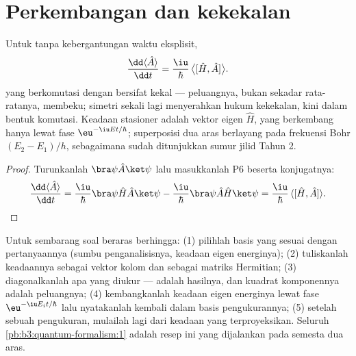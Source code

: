 \section{Perkembangan dan kekekalan}

\begin{proposition}\label{prop:b3:quantum-formalism:evolution}
Untuk  tanpa kebergantungan waktu eksplisit,
\[
\frac{\dd\langle\hat A\rangle}{\dd t}
 = \frac{\iu}{\hbar}\,\big\langle[\hat H, \hat A]\big\rangle .
\]
 yang berkomutasi dengan  bersifat kekal
--- peluangnya, bukan sekadar rata-ratanya, membeku; simetri sekali lagi
menyerahkan hukum kekekalan, kini dalam bentuk komutasi. Keadaan
stasioner adalah vektor eigen $\hat H$, yang berkembang hanya lewat fase
$\eu^{-\iu Et/\hbar}$; superposisi dua aras berlayang pada frekuensi
Bohr $(E_2 - E_1)/h$, sebagaimana sudah ditunjukkan sumur jilid Tahun 2.
\end{proposition}

\begin{proof}
Turunkanlah $\bra\psi\hat A\ket\psi$ lalu masukkanlah P6 beserta
konjugatnya:
\[
\frac{\dd\langle\hat A\rangle}{\dd t}
 = \frac{\iu}{\hbar}\bra\psi\hat H\hat A\ket\psi
 - \frac{\iu}{\hbar}\bra\psi\hat A\hat H\ket\psi
 = \frac{\iu}{\hbar}\,\langle[\hat H, \hat A]\rangle .
\qedhere
\]
\end{proof}

\begin{method}\label{met:b3:quantum-formalism:method}
Untuk sembarang soal beraras berhingga: (1) pilihlah basis yang sesuai
dengan pertanyaannya (sumbu penganalisisnya, keadaan eigen energinya);
(2) tuliskanlah keadaannya sebagai vektor kolom dan 
sebagai matriks Hermitian; (3) diagonalkanlah apa yang diukur ---  adalah hasilnya, dan kuadrat komponennya adalah peluangnya;
(4) kembangkanlah keadaan eigen energinya lewat fase
$\eu^{-\iu E_it/\hbar}$ lalu nyatakanlah kembali dalam basis
pengukurannya; (5) setelah sebuah pengukuran, mulailah lagi dari keadaan
yang terproyeksikan. Seluruh \cref{pb:b3:quantum-formalism:1} adalah
resep ini yang dijalankan pada semesta dua aras.
\end{method}


